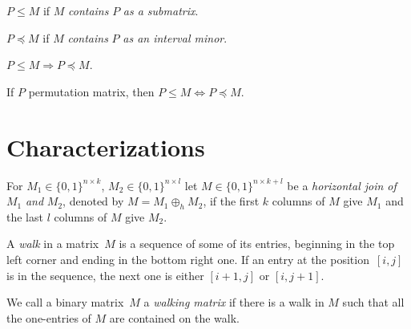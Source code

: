 \documentclass[12pt,a4paper]{report}
\begin{document}
\linenumbers

\newsavebox{\smlmat}
\newsavebox{\smlmatb}
\newsavebox{\smlmatc}

\begin{defn}
$P\leq M$ if $M$ \emph{contains} $P$ \emph{as a submatrix}.
\end{defn}
\begin{defn}
$P\preceq M$ if $M$ \emph{contains} $P$ \emph{as an interval minor}.
\end{defn}
\begin{obs}
$P\leq M\Rightarrow P\preceq M$.
\end{obs}
\begin{obs}
If $P$ permutation matrix, then $P\leq M\Leftrightarrow P\preceq M$.
\end{obs}

\section{Characterizations}
\begin{defn}
For $M_1\in\{0,1\}^{n\times k}$, $M_2\in\{0,1\}^{n\times l}$ let $M\in\{0,1\}^{n\times k+l}$ be a \emph{horizontal join of} $M_1$ \emph{and} $M_2$, denoted by $M=M_1\oplus_hM_2$, if the first $k$ columns of $M$ give $M_1$ and the last $l$ columns of $M$ give $M_2$.
\end{defn}
\begin{defn}
A \emph{walk} in a matrix~$M$ is a sequence of some of its entries, beginning in the top left corner and ending in the bottom right one. If an entry at the position~$[i,j]$ is in the sequence, the next one is either $[i+1,j]$ or $[i,j+1]$.
\end{defn}
\begin{defn}
We call a binary matrix~$M$ a \emph{walking matrix} if there is a walk in $M$ such that all the one-entries of $M$ are contained on the walk.
\end{defn}
\end{document}
